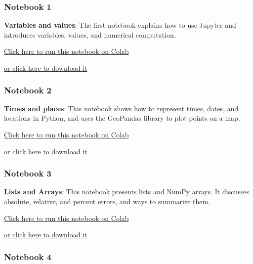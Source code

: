 \hypertarget{notebook-1}{%
\subsubsection{Notebook 1}\label{notebook-1}}

\textbf{Variables and values}: The first notebook explains how to use
Jupyter and introduces variables, values, and numerical computation.

\href{https://colab.research.google.com/github/AllenDowney/ElementsOfDataScience/blob/master/01_variables.ipynb}{Click
here to run this notebook on Colab}

\href{https://github.com/AllenDowney/ElementsOfDataScience/raw/master/01_variables.ipynb}{or
click here to download it}

\hypertarget{notebook-2}{%
\subsubsection{Notebook 2}\label{notebook-2}}

\textbf{Times and places}: This notebook shows how to represent times,
dates, and locations in Python, and uses the GeoPandas library to plot
points on a map.

\href{https://colab.research.google.com/github/AllenDowney/ElementsOfDataScience/blob/master/02_times.ipynb}{Click
here to run this notebook on Colab}

\href{https://github.com/AllenDowney/ElementsOfDataScience/raw/master/02_times.ipynb}{or
click here to download it}

\hypertarget{notebook-3}{%
\subsubsection{Notebook 3}\label{notebook-3}}

\textbf{Lists and Arrays}: This notebook presents lists and NumPy
arrays. It discusses absolute, relative, and percent errors, and ways to
summarize them.

\href{https://colab.research.google.com/github/AllenDowney/ElementsOfDataScience/blob/master/03_arrays.ipynb}{Click
here to run this notebook on Colab}

\href{https://github.com/AllenDowney/ElementsOfDataScience/raw/master/03_arrays.ipynb}{or
click here to download it}

\hypertarget{notebook-4}{%
\subsubsection{Notebook 4}\label{notebook-4}}

